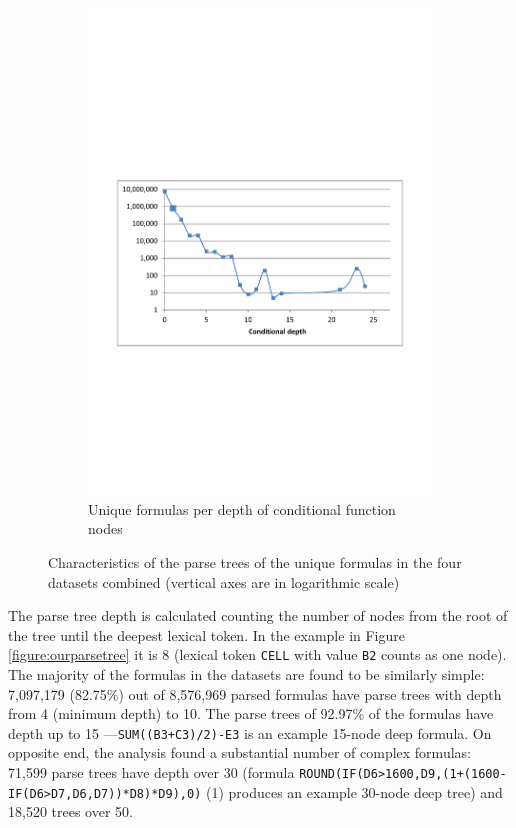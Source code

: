 \documentclass[times]{smrauth}
\begin{document}
\begin{figure}
\begin{subfigure}[b]{0.49\textwidth}
		\includegraphics[width=1\textwidth]{img/depths4}
		\caption{Unique formulas per depth of conditional function nodes}
		\label{fig:depthConditional}
	\end{subfigure}
	\caption{Characteristics of the parse trees of the unique formulas in the four datasets combined (vertical axes are in logarithmic scale)}\label{Figure:depths}
\end{figure}

The parse tree depth is calculated counting the number of nodes from the root of the tree until the deepest lexical token. In the example in Figure \ref{figure:ourparsetree} it is 8 (lexical token \texttt{CELL} with value \texttt{B2} counts as one node). The majority of the formulas in the datasets are found to be similarly simple: 7,097,179 (82.75\%)
out of 8,576,969 parsed formulas have parse trees with depth from 4 (minimum depth) to 10. The parse trees of 92.97\% of the formulas have depth up to 15 ---\texttt{SUM((B3+C3)/2)-E3} is an example 15-node deep formula. On opposite end, the analysis found a substantial number of complex formulas: 71,599 parse trees have depth over 30 (formula \texttt{ROUND(IF(D6>1600,D9,(1+(1600-IF(D6>D7,D6,D7))*D8)*D9),0)} (1) produces an example 30-node deep tree) and 18,520 trees over 50.
\end{document}
